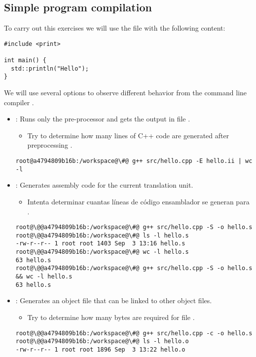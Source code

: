 \subsection{Simple program compilation}

To carry out this exercises we will use the file 
with the following content:

\begin{lstlisting}
#include <print>

int main() {
  std::println("Hello");
}
\end{lstlisting}

We will use several options to observe different behavior from the command line
compiler 
.

\begin{itemize}
  \item {}: 
  Runs only the pre-processor and gets the output in file .
    \begin{itemize}
      \item Try to determine how many lines of C++ code are generated
            after preprocessing .
    \end{itemize}
\begin{lstlisting}[style=terminal,escapechar=@]
root@a4794809b16b:/workspace@\#@ g++ src/hello.cpp -E hello.ii | wc -l
\end{lstlisting}


  \item {}:
  Generates assembly code for the current translation unit.
    \begin{itemize}
      \item Intenta determinar cuantas líneas de código ensamblador se generan para .
    \end{itemize}
\begin{lstlisting}[style=terminal,escapechar=@]
root@\@@a4794809b16b:/workspace@\#@ g++ src/hello.cpp -S -o hello.s
root@\@@a4794809b16b:/workspace@\#@ ls -l hello.s
-rw-r--r-- 1 root root 1403 Sep  3 13:16 hello.s
root@\@@a4794809b16b:/workspace@\#@ wc -l hello.s 
63 hello.s
root@\@@a4794809b16b:/workspace@\#@ g++ src/hello.cpp -S -o hello.s && wc -l hello.s 
63 hello.s
\end{lstlisting}

  \item {}:
  Generates an object file  that can be linked to other object
  files.
    \begin{itemize}
      \item Try to determine how many bytes are required for file .
    \end{itemize}
\begin{lstlisting}[style=terminal,escapechar=@]
root@\@@a4794809b16b:/workspace@\#@ g++ src/hello.cpp -c -o hello.s
root@\@@a4794809b16b:/workspace@\#@ ls -l hello.o
-rw-r--r-- 1 root root 1896 Sep  3 13:22 hello.o
\end{lstlisting}


\end{itemize}
